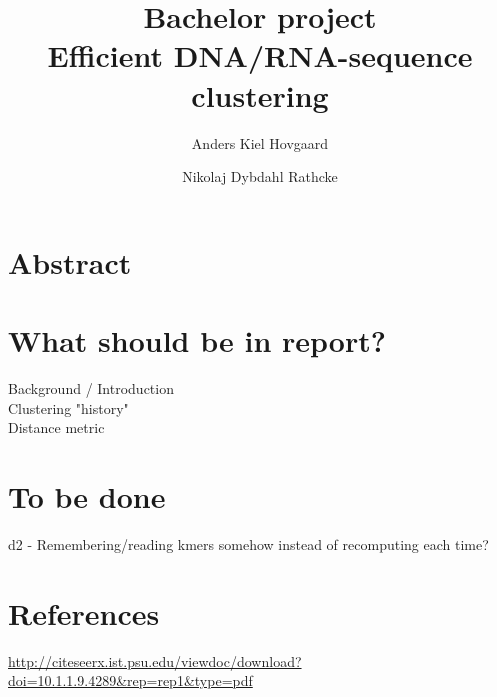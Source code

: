 \documentclass[11pt,a4paper]{article}
\title{Bachelor project \\
       \vspace{2mm}
       {\LARGE Efficient DNA/RNA-sequence clustering}}
\author{Anders Kiel Hovgaard \and Nikolaj Dybdahl Rathcke}
\begin{document}
\maketitle
\thispagestyle{fancy}

\section{Abstract}

\section{What should be in report?}
Background / Introduction \\
Clustering "history" \\
Distance metric \\

\section{To be done}
d2 - Remembering/reading kmers somehow instead of recomputing each time?




\section{References}
\url{http://citeseerx.ist.psu.edu/viewdoc/download?doi=10.1.1.9.4289&rep=rep1&type=pdf}
\end{document}

